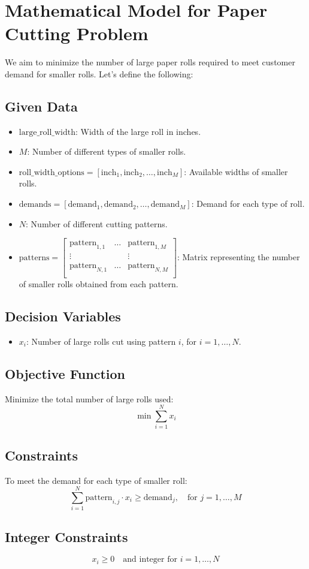 \documentclass{article}
\begin{document}
\section*{Mathematical Model for Paper Cutting Problem}

We aim to minimize the number of large paper rolls required to meet customer demand for smaller rolls. Let's define the following:

\subsection*{Given Data}
\begin{itemize}
    \item \( \text{large\_roll\_width} \): Width of the large roll in inches.
    \item \( M \): Number of different types of smaller rolls.
    \item \( \text{roll\_width\_options} = [\text{inch}_1, \text{inch}_2, \ldots, \text{inch}_M] \): Available widths of smaller rolls.
    \item \( \text{demands} = [\text{demand}_1, \text{demand}_2, \ldots, \text{demand}_M] \): Demand for each type of roll.
    \item \( N \): Number of different cutting patterns.
    \item \( \text{patterns} = \left[ \begin{array}{ccc}
    \text{pattern}_{1,1} & \ldots & \text{pattern}_{1,M} \\
    \vdots & & \vdots \\
    \text{pattern}_{N,1} & \ldots & \text{pattern}_{N,M} \\
    \end{array} \right] \): Matrix representing the number of smaller rolls obtained from each pattern.
\end{itemize}

\subsection*{Decision Variables}
\begin{itemize}
    \item \( x_i \): Number of large rolls cut using pattern \( i \), for \( i = 1, \ldots, N \).
\end{itemize}

\subsection*{Objective Function}
Minimize the total number of large rolls used:
\[
\min \sum_{i=1}^{N} x_i
\]

\subsection*{Constraints}
To meet the demand for each type of smaller roll:
\[
\sum_{i=1}^{N} \text{pattern}_{i,j} \cdot x_i \geq \text{demand}_j, \quad \text{for } j = 1, \ldots, M
\]

\subsection*{Integer Constraints}
\[
x_i \geq 0 \quad \text{and integer for } i = 1, \ldots, N
\]
\end{document}
